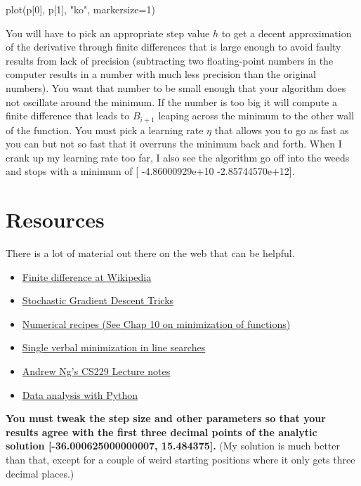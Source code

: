 \begin{fullwidth}
\begin{pyverbatim}
plot(p[0], p[1], "ko", markersize=1)
\end{pyverbatim}

You will have to pick an appropriate step value $h$ to get a decent approximation of the derivative through finite differences that is large enough to avoid faulty results from lack of precision (subtracting two floating-point numbers in the computer results in a number with much less precision than the original numbers). You want that number to be small enough that your algorithm does not oscillate around the minimum. If the number is too big it will compute a finite difference that leads to $B_{i+1}$ leaping across the minimum to the other wall of the function. You must pick a learning rate $\eta$ that allows you to go as fast as you can but not so fast that it overruns the minimum back and forth. When I crank up my learning rate too far, I also see the algorithm go off into the weeds and stops with a minimum of [ -4.86000929e+10  -2.85744570e+12].

\section{Resources}

There is a lot of material out there on the web that can be helpful.

\begin{itemize}
\item \href{http://en.wikipedia.org/wiki/Finite_difference}{Finite difference at Wikipedia}
\item \href{http://research.microsoft.com/pubs/192769/tricks-2012.pdf}{Stochastic Gradient Descent Tricks}
\item \href{http://apps.nrbook.com/fortran/index.html}{Numerical recipes (See Chap 10 on minimization of functions)}
\item \href{http://adl.stanford.edu/aa222/Lecture_Notes_files/AA222-Lecture2.pdf}{Single verbal minimization in line searches}
\item \href{http://cs229.stanford.edu/notes/cs229-notes1.pdf}{Andrew Ng's CS229 Lecture notes}
\item \href{http://people.duke.edu/~ccc14/pcfb/analysis.html}{Data analysis with Python}
\end{itemize}

{\bf You must tweak the step size and other parameters so that your results agree with the first {\bf three} decimal points of the analytic solution [-36.000625000000007, 15.484375].} (My solution is much better than that, except for a couple of weird starting positions where it only gets three decimal places.)


\end{fullwidth}

